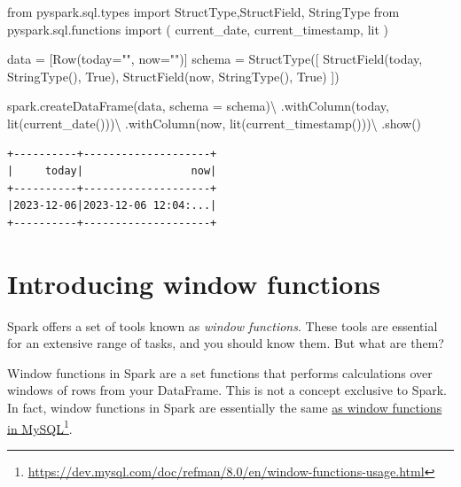 \documentclass[
  11pt,
  letterpaper,
  DIV=11,
  numbers=noendperiod]{scrreprt}
\newenvironment{Shaded}{\begin{snugshade}}{\end{snugshade}}
\newcommand{\ImportTok}[1]{\textcolor[rgb]{0.00,0.46,0.62}{#1}}
\newcommand{\NormalTok}[1]{\textcolor[rgb]{0.00,0.23,0.31}{#1}}
\newcommand{\OperatorTok}[1]{\textcolor[rgb]{0.37,0.37,0.37}{#1}}
\newcommand{\StringTok}[1]{\textcolor[rgb]{0.13,0.47,0.30}{#1}}
\newcommand{\VariableTok}[1]{\textcolor[rgb]{0.07,0.07,0.07}{#1}}
\begin{document}
\begin{Shaded}
\begin{Highlighting}[]
\ImportTok{from}\NormalTok{ pyspark.sql.types }\ImportTok{import}\NormalTok{ StructType,StructField, StringType}
\ImportTok{from}\NormalTok{ pyspark.sql.functions }\ImportTok{import}\NormalTok{ (}
\NormalTok{    current\_date,}
\NormalTok{    current\_timestamp,}
\NormalTok{    lit}
\NormalTok{)}

\NormalTok{data }\OperatorTok{=}\NormalTok{ [Row(today}\OperatorTok{=}\StringTok{""}\NormalTok{, now}\OperatorTok{=}\StringTok{""}\NormalTok{)]}
\NormalTok{schema }\OperatorTok{=}\NormalTok{ StructType([}
\NormalTok{    StructField(}\StringTok{\textquotesingle{}today\textquotesingle{}}\NormalTok{, StringType(), }\VariableTok{True}\NormalTok{),}
\NormalTok{    StructField(}\StringTok{\textquotesingle{}now\textquotesingle{}}\NormalTok{, StringType(), }\VariableTok{True}\NormalTok{)}
\NormalTok{])}

\NormalTok{spark.createDataFrame(data, schema }\OperatorTok{=}\NormalTok{ schema)}\OperatorTok{\textbackslash{}}
\NormalTok{    .withColumn(}\StringTok{\textquotesingle{}today\textquotesingle{}}\NormalTok{, lit(current\_date()))}\OperatorTok{\textbackslash{}}
\NormalTok{    .withColumn(}\StringTok{\textquotesingle{}now\textquotesingle{}}\NormalTok{, lit(current\_timestamp()))}\OperatorTok{\textbackslash{}}
\NormalTok{    .show()}
\end{Highlighting}
\end{Shaded}

\begin{verbatim}
+----------+--------------------+
|     today|                 now|
+----------+--------------------+
|2023-12-06|2023-12-06 12:04:...|
+----------+--------------------+
\end{verbatim}


\hypertarget{sec-window-functions}{%
\chapter{Introducing window functions}\label{sec-window-functions}}

Spark offers a set of tools known as \emph{window functions}. These
tools are essential for an extensive range of tasks, and you should know
them. But what are them?

Window functions in Spark are a set functions that performs calculations
over windows of rows from your DataFrame. This is not a concept
exclusive to Spark. In fact, window functions in Spark are essentially
the same
\href{https://dev.mysql.com/doc/refman/8.0/en/window-functions-usage.html}{as
window functions in MySQL}\footnote{\url{https://dev.mysql.com/doc/refman/8.0/en/window-functions-usage.html}}.
\end{document}
